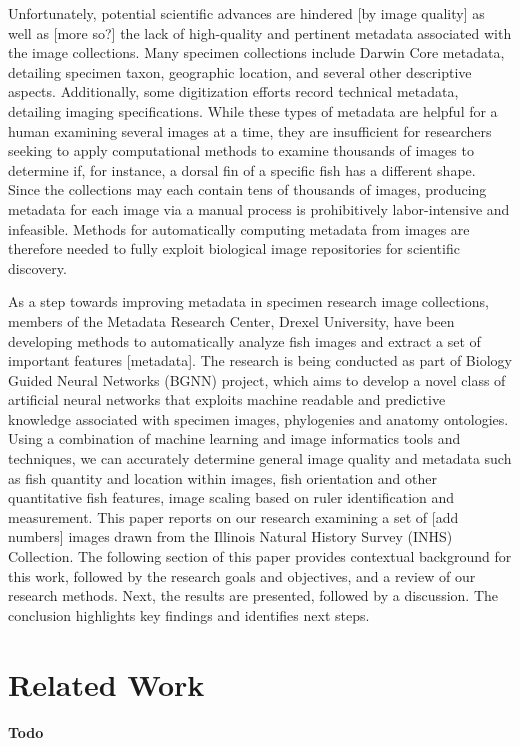 \documentclass[screen,review]{acmart}
\begin{document}
Unfortunately, potential scientific advances are hindered [by image quality] as well as [more so?] the lack of high-quality and pertinent metadata associated with the image collections. Many specimen collections include Darwin Core metadata, detailing specimen taxon, geographic location, and several other descriptive aspects. Additionally, some digitization efforts record technical metadata, detailing imaging specifications. While these types of metadata are helpful for a human examining several images at a time, they are insufficient for researchers seeking to apply computational methods to examine thousands of images to determine if, for instance, a dorsal fin of a specific fish has a different shape. Since the collections may each contain tens of thousands of images, producing metadata for each image via a manual process is prohibitively labor-intensive and infeasible. Methods for automatically computing metadata from images are therefore needed to fully exploit biological image repositories for scientific discovery.

As a step towards improving metadata in specimen research image collections, members of the Metadata Research Center, Drexel University, have been developing methods to automatically analyze fish images and extract a set of important features [metadata]. The research is being conducted as part of Biology Guided Neural Networks (BGNN) project, which aims to develop a novel class of artificial neural networks that exploits machine readable and predictive knowledge associated with specimen images, phylogenies and anatomy ontologies. Using a combination of machine learning and image informatics tools and techniques, we can accurately determine general image quality and metadata such as fish quantity and location within images, fish orientation and other quantitative fish features, image scaling based on ruler identification and measurement. This paper reports on our research examining a set of [add numbers] images drawn from the Illinois Natural History Survey (INHS) Collection. The following section of this paper provides contextual background for this work, followed by the research goals and objectives, and a review of our research methods. Next, the results are presented, followed by a discussion. The conclusion highlights key findings and identifies next steps.

\section{Related Work}
\textbf{Todo}
\end{document}
